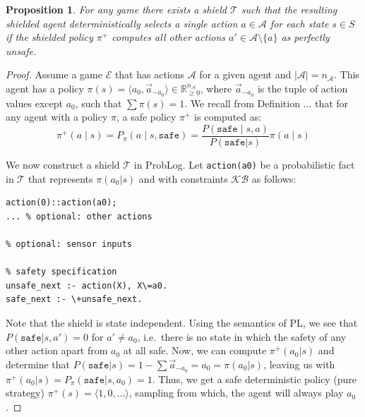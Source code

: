 \documentclass{ecai}
\theoremstyle{plain}
\newtheorem{proposition}[theorem]{Proposition}
\newtheorem{lemma}[theorem]{Lemma}
\theoremstyle{definition}
\theoremstyle{remark}
\begin{document}
\begin{proposition}
    For any game there exists a shield $\mathcal{T}$ such that the resulting shielded agent deterministically selects a single action $a\in\mathcal{A}$ for each state $s\in S$ if the shielded policy $\pi^+$ computes all other actions $a'\in\mathcal{A}\setminus \{a\}$ as perfectly unsafe.
\end{proposition}
\begin{proof}
Assume a game $\mathcal{E}$ that has actions $\mathcal{A}$ for a given agent and $|\mathcal{A}|=n_\mathcal{A}$. This agent has a policy $\pi(s)=\langle a_0,\vec{a}_{-a_0}\rangle\in\mathbb{R}^{n_\mathcal{A}}_{\geq0}$, where $\vec{a}_{-a_0}$ is the tuple of action values except $a_0$, such that $\sum\pi(s)=1$. We recall from Definition ... that for any agent with a policy $\pi$, a safe policy $\pi^+$ is computed as:
\begin{equation*}
    \pi^+(a\mid s)=P_\pi(a\mid s,\mathtt{safe})=\frac{P(\mathtt{safe}\mid s,a)}{P(\mathtt {safe}|s)}\pi(a\mid s)
\end{equation*}

We now construct a shield $\mathcal{T}$ in ProbLog. Let \verb|action(a0)| be a probabilistic fact in $\mathcal{T}$ that represents $\pi(a_0|s)$ and with constraints $\mathcal{KB}$ as follows:
\begin{lstlisting}
action(0)::action(a0);
... % optional: other actions

% optional: sensor inputs

% safety specification
unsafe_next :- action(X), X\=a0.
safe_next :- \+unsafe_next.
\end{lstlisting}

Note that the shield is state independent. Using the semantics of PL, we see that $P(\texttt{safe}| s,a')=0$ for $a'\neq a_0$, i.e.\ there is no state in which the safety of any other action apart from $a_0$ at all safe. Now, we can compute $\pi^+(a_0| s)$ and determine that $P(\texttt{safe}|s)=1-\sum\vec{a}_{-a_0}=a_0=\pi(a_0|s)$, leaving us with $\pi^+(a_0|s)=P_\pi(\texttt{safe}| s, a_0)=1$. Thus, we get a safe deterministic policy (pure strategy) $\pi^+(s)=\langle 1, 0, ...\rangle$, sampling from which, the agent will always play $a_0$.\end{proof}
\end{document}
